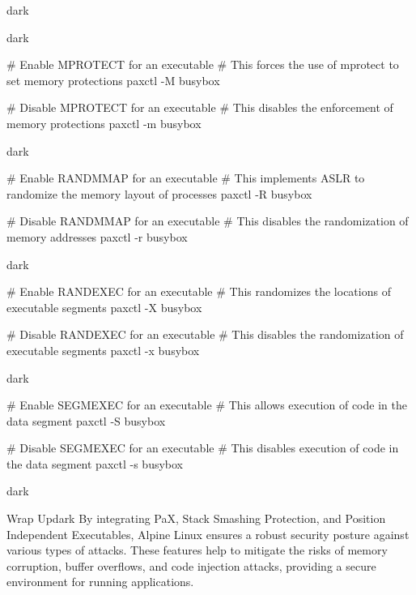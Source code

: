 \begin{baseBoxThree}{}{dark}
    \label{MPROTECT}
    \begin{baseBoxThree}{}{dark}
        \begin{posnex}
# Enable MPROTECT for an executable
# This forces the use of mprotect to set memory protections
paxctl -M busybox

# Disable MPROTECT for an executable
# This disables the enforcement of memory protections
paxctl -m busybox
        \end{posnex}
    \end{baseBoxThree}
    \smallskip
    \label{RANDMMAP}
    \begin{baseBoxThree}{}{dark}
        \begin{posnex}
# Enable RANDMMAP for an executable
# This implements ASLR to randomize the memory layout of processes
paxctl -R busybox

# Disable RANDMMAP for an executable
# This disables the randomization of memory addresses
paxctl -r busybox
        \end{posnex}
    \end{baseBoxThree}
    \smallskip
    \label{RANDEXEC}
    \begin{baseBoxThree}{}{dark}
        \begin{posnex}
# Enable RANDEXEC for an executable
# This randomizes the locations of executable segments
paxctl -X busybox

# Disable RANDEXEC for an executable
# This disables the randomization of executable segments
paxctl -x busybox
        \end{posnex}
    \end{baseBoxThree}
    \smallskip
    \label{SEGMEXEC}
    \begin{baseBoxThree}{}{dark}
        \begin{posnex}
# Enable SEGMEXEC for an executable
# This allows execution of code in the data segment
paxctl -S busybox

# Disable SEGMEXEC for an executable
# This disables execution of code in the data segment
paxctl -s busybox
        \end{posnex}
    \end{baseBoxThree}
    \smallskip
\end{baseBoxThree}

\begin{baseBoxThree}{}{dark}
    \smallskip
    \begin{baseBoxThree}{Wrap Up}{dark}
        By integrating PaX, Stack Smashing Protection, and Position Independent Executables, Alpine Linux ensures a robust security posture against various types of attacks.
        These features help to mitigate the risks of memory corruption, buffer overflows, and code injection attacks, providing a secure environment for running applications.
    \end{baseBoxThree}
    \smallskip
\end{baseBoxThree}
